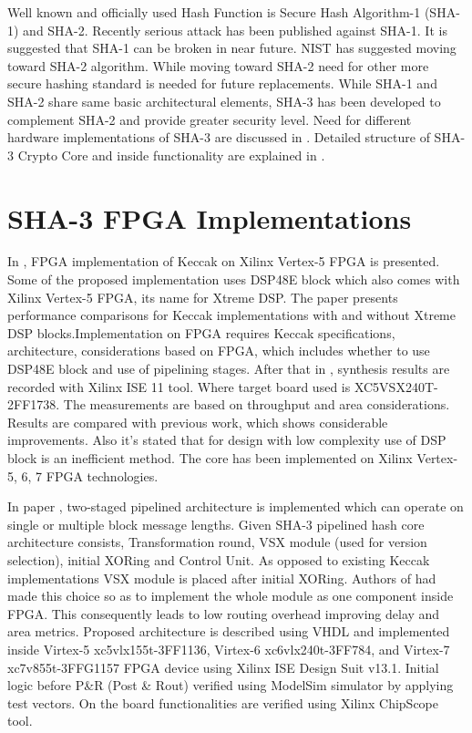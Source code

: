 Well known and officially used Hash Function is Secure Hash Algorithm-1 (SHA-1) and SHA-2. Recently serious attack has been published against SHA-1. It is suggested that SHA-1 can be broken in near future. NIST has suggested moving toward SHA-2 algorithm. While moving toward SHA-2 need for other more secure hashing standard is needed for future replacements. While SHA-1 and SHA-2 share same basic architectural elements, SHA-3 has been developed to complement SHA-2 and provide greater security level. Need for different hardware implementations of SHA-3 are discussed in \cite{tosha3}. Detailed structure of SHA-3 Crypto Core and inside functionality are explained in \cite{insha3}. \par

\section{SHA-3 FPGA Implementations}

In \cite{fpgades}, FPGA implementation of Keccak on Xilinx Vertex-5 FPGA is presented. Some of the proposed implementation uses DSP48E block which also comes with Xilinx Vertex-5 FPGA, its name for Xtreme DSP. The paper presents performance comparisons for Keccak implementations with and without Xtreme DSP blocks.Implementation on FPGA requires Keccak specifications, architecture, considerations based on FPGA, which includes whether to use DSP48E block and use of pipelining stages. After that in \cite{fpgades}, synthesis results are recorded with Xilinx ISE 11 tool. Where target board used is XC5VSX240T-2FF1738.  The measurements are based on throughput and area considerations. Results are compared with previous work, which shows considerable improvements. Also it’s stated that for design with low complexity use of DSP block is an inefficient method. The core has been implemented on Xilinx Vertex-5, 6, 7 FPGA technologies. \par

In paper \cite{hight}, two-staged pipelined architecture is implemented which can operate on single or multiple block message lengths. Given SHA-3 pipelined hash core architecture consists, Transformation round, VSX module (used for version selection), initial XORing and Control Unit. As opposed to existing Keccak implementations VSX module is placed after initial XORing. Authors of \cite{hight} had made this choice so as to implement the whole module as one component inside FPGA. This consequently leads to low routing overhead improving delay and area metrics. Proposed architecture is described using VHDL and implemented inside Virtex-5 xc5vlx155t-3FF1136, Virtex-6 xc6vlx240t-3FF784, and Virtex-7 xc7v855t-3FFG1157 FPGA device using Xilinx ISE Design Suit v13.1. Initial logic before P\&R (Post \& Rout) verified using ModelSim simulator by applying test vectors. On the board functionalities are verified using Xilinx ChipScope tool. \par

